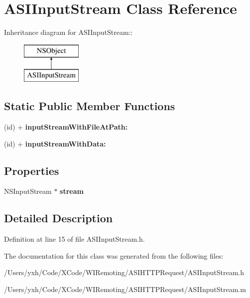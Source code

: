 \hypertarget{interface_a_s_i_input_stream}{
\section{ASIInputStream Class Reference}
\label{interface_a_s_i_input_stream}
}
Inheritance diagram for ASIInputStream::\begin{figure}[H]
\begin{center}
\leavevmode
\includegraphics[height=2cm]{interface_a_s_i_input_stream}
\end{center}
\end{figure}
\subsection*{Static Public Member Functions}
\begin{DoxyCompactItemize}
\item 
\hypertarget{interface_a_s_i_input_stream_a2aab477336bcc29c284af17ba7ace18a}{
(id) + {\bfseries inputStreamWithFileAtPath:}}
\label{interface_a_s_i_input_stream_a2aab477336bcc29c284af17ba7ace18a}

\item 
\hypertarget{interface_a_s_i_input_stream_a2e428cfefc680f82c268399a6c8023da}{
(id) + {\bfseries inputStreamWithData:}}
\label{interface_a_s_i_input_stream_a2e428cfefc680f82c268399a6c8023da}

\end{DoxyCompactItemize}
\subsection*{Properties}
\begin{DoxyCompactItemize}
\item 
\hypertarget{interface_a_s_i_input_stream_ac09491abd1aacf8280b2bee993a6cc6d}{
NSInputStream $\ast$ {\bfseries stream}}
\label{interface_a_s_i_input_stream_ac09491abd1aacf8280b2bee993a6cc6d}

\end{DoxyCompactItemize}


\subsection{Detailed Description}


Definition at line 15 of file ASIInputStream.h.

The documentation for this class was generated from the following files:\begin{DoxyCompactItemize}
\item 
/Users/yxh/Code/XCode/WIRemoting/ASIHTTPRequest/ASIInputStream.h\item 
/Users/yxh/Code/XCode/WIRemoting/ASIHTTPRequest/ASIInputStream.m\end{DoxyCompactItemize}

